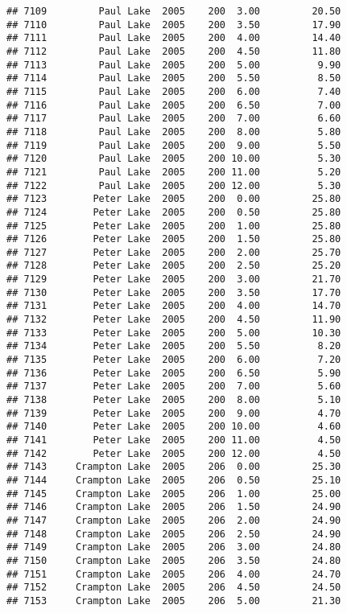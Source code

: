 \documentclass[
]{article}
\begin{document}
\begin{verbatim}
## 7109         Paul Lake  2005    200  3.00         20.50
## 7110         Paul Lake  2005    200  3.50         17.90
## 7111         Paul Lake  2005    200  4.00         14.40
## 7112         Paul Lake  2005    200  4.50         11.80
## 7113         Paul Lake  2005    200  5.00          9.90
## 7114         Paul Lake  2005    200  5.50          8.50
## 7115         Paul Lake  2005    200  6.00          7.40
## 7116         Paul Lake  2005    200  6.50          7.00
## 7117         Paul Lake  2005    200  7.00          6.60
## 7118         Paul Lake  2005    200  8.00          5.80
## 7119         Paul Lake  2005    200  9.00          5.50
## 7120         Paul Lake  2005    200 10.00          5.30
## 7121         Paul Lake  2005    200 11.00          5.20
## 7122         Paul Lake  2005    200 12.00          5.30
## 7123        Peter Lake  2005    200  0.00         25.80
## 7124        Peter Lake  2005    200  0.50         25.80
## 7125        Peter Lake  2005    200  1.00         25.80
## 7126        Peter Lake  2005    200  1.50         25.80
## 7127        Peter Lake  2005    200  2.00         25.70
## 7128        Peter Lake  2005    200  2.50         25.20
## 7129        Peter Lake  2005    200  3.00         21.70
## 7130        Peter Lake  2005    200  3.50         17.70
## 7131        Peter Lake  2005    200  4.00         14.70
## 7132        Peter Lake  2005    200  4.50         11.90
## 7133        Peter Lake  2005    200  5.00         10.30
## 7134        Peter Lake  2005    200  5.50          8.20
## 7135        Peter Lake  2005    200  6.00          7.20
## 7136        Peter Lake  2005    200  6.50          5.90
## 7137        Peter Lake  2005    200  7.00          5.60
## 7138        Peter Lake  2005    200  8.00          5.10
## 7139        Peter Lake  2005    200  9.00          4.70
## 7140        Peter Lake  2005    200 10.00          4.60
## 7141        Peter Lake  2005    200 11.00          4.50
## 7142        Peter Lake  2005    200 12.00          4.50
## 7143     Crampton Lake  2005    206  0.00         25.30
## 7144     Crampton Lake  2005    206  0.50         25.10
## 7145     Crampton Lake  2005    206  1.00         25.00
## 7146     Crampton Lake  2005    206  1.50         24.90
## 7147     Crampton Lake  2005    206  2.00         24.90
## 7148     Crampton Lake  2005    206  2.50         24.90
## 7149     Crampton Lake  2005    206  3.00         24.80
## 7150     Crampton Lake  2005    206  3.50         24.80
## 7151     Crampton Lake  2005    206  4.00         24.70
## 7152     Crampton Lake  2005    206  4.50         24.50
## 7153     Crampton Lake  2005    206  5.00         21.30

\end{verbatim}
\end{document}
